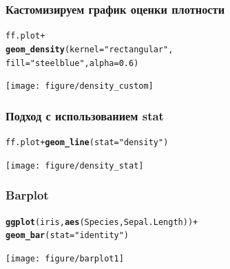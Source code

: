 \documentclass[compress]{beamer}\usepackage[]{graphicx}\usepackage[]{color}
\makeatletter
\newcommand{\hlnum}[1]{\textcolor[rgb]{0.686,0.059,0.569}{#1}}%
\newcommand{\hlstr}[1]{\textcolor[rgb]{0.192,0.494,0.8}{#1}}%
\newcommand{\hlopt}[1]{\textcolor[rgb]{0,0,0}{#1}}%
\newcommand{\hlstd}[1]{\textcolor[rgb]{0.345,0.345,0.345}{#1}}%
\newcommand{\hlkwc}[1]{\textcolor[rgb]{0.333,0.667,0.333}{#1}}%
\newcommand{\hlkwd}[1]{\textcolor[rgb]{0.737,0.353,0.396}{\textbf{#1}}}%
\newenvironment{kframe}{%
 \def\at@end@of@kframe{}%
 \ifinner\ifhmode%
  \def\at@end@of@kframe{\end{minipage}}%
  \begin{minipage}{\columnwidth}%
 \fi\fi%
 \def\FrameCommand##1{\hskip\@totalleftmargin \hskip-\fboxsep
 \colorbox{shadecolor}{##1}\hskip-\fboxsep
     \hskip-\linewidth \hskip-\@totalleftmargin \hskip\columnwidth}%
 \MakeFramed {\advance\hsize-\width
   \@totalleftmargin\z@ \linewidth\hsize
   \@setminipage}}%
 {\par\unskip\endMakeFramed%
 \at@end@of@kframe}
\newenvironment{knitrout}{}{} %
\makeatother
\begin{document}
\begin{frame}[fragile]
\frametitle{Кастомизируем график оценки плотности}
\begin{knitrout}\footnotesize
{}\color{fgcolor}\begin{kframe}
\begin{alltt}
\hlstd{ff.plot} \hlopt{+}
  \hlkwd{geom_density}\hlstd{(}\hlkwc{kernel} \hlstd{=} \hlstr{"rectangular"}\hlstd{,}
               \hlkwc{fill} \hlstd{=} \hlstr{"steelblue"}\hlstd{,} \hlkwc{alpha} \hlstd{=} \hlnum{0.6}\hlstd{)}
\end{alltt}
\end{kframe}
\texttt{[image: figure/density\_custom]} 

\end{knitrout}

\end{frame}

\begin{frame}[fragile]
\frametitle{Подход с использованием stat}
\begin{knitrout}\footnotesize
{}\color{fgcolor}\begin{kframe}
\begin{alltt}
\hlstd{ff.plot} \hlopt{+} \hlkwd{geom_line}\hlstd{(}\hlkwc{stat} \hlstd{=} \hlstr{"density"}\hlstd{)}
\end{alltt}
\end{kframe}
\texttt{[image: figure/density\_stat]} 

\end{knitrout}

\end{frame}

\begin{frame}[fragile]
\frametitle{Barplot}
\begin{knitrout}\footnotesize
{}\color{fgcolor}\begin{kframe}
\begin{alltt}
\hlkwd{ggplot}\hlstd{(iris,} \hlkwd{aes}\hlstd{(Species, Sepal.Length))} \hlopt{+}
  \hlkwd{geom_bar}\hlstd{(}\hlkwc{stat} \hlstd{=} \hlstr{"identity"}\hlstd{)}
\end{alltt}
\end{kframe}
\texttt{[image: figure/barplot1]} 

\end{knitrout}

\end{frame}
\end{document}
